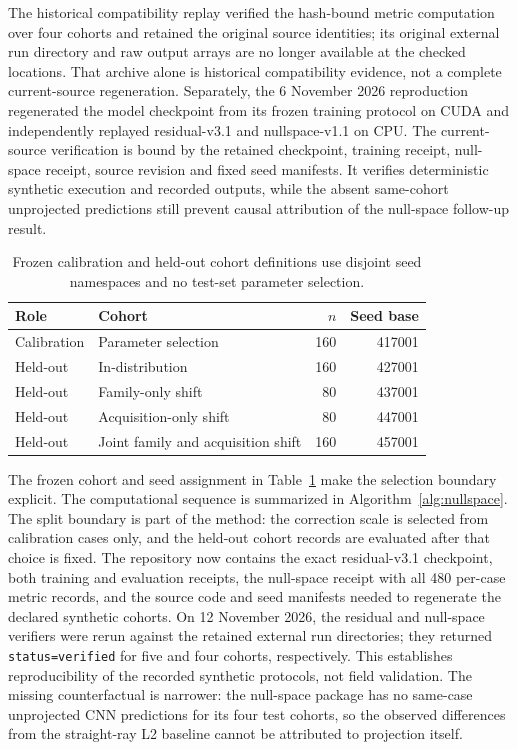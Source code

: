 \documentclass[11pt]{article}
\begin{document}


The historical compatibility replay verified the hash-bound metric computation over four cohorts and retained the original source identities; its original external run directory and raw output arrays are no longer available at the checked locations. That archive alone is historical compatibility evidence, not a complete current-source regeneration. Separately, the 6 November 2026 reproduction regenerated the model checkpoint from its frozen training protocol on CUDA and independently replayed residual-v3.1 and nullspace-v1.1 on CPU. The current-source verification is bound by the retained checkpoint, training receipt, null-space receipt, source revision and fixed seed manifests. It verifies deterministic synthetic execution and recorded outputs, while the absent same-cohort unprojected predictions still prevent causal attribution of the null-space follow-up result.

\begin{table}[htbp]
\centering
\caption{Frozen calibration and held-out cohort definitions use disjoint seed namespaces and no test-set parameter selection.}
\label{tab:cohort-design}
\begin{tabular}{llrr}
\toprule
Role & Cohort & $n$ & Seed base \\
\midrule
Calibration & Parameter selection & 160 & 417001 \\
Held-out & In-distribution & 160 & 427001 \\
Held-out & Family-only shift & 80 & 437001 \\
Held-out & Acquisition-only shift & 80 & 447001 \\
Held-out & Joint family and acquisition shift & 160 & 457001 \\
\bottomrule
\end{tabular}
\end{table}

The frozen cohort and seed assignment in Table~\ref{tab:cohort-design} make the selection boundary explicit. The computational sequence is summarized in Algorithm~\ref{alg:nullspace}. The split boundary is part of the method: the correction scale is selected from calibration cases only, and the held-out cohort records are evaluated after that choice is fixed. The repository now contains the exact residual-v3.1 checkpoint, both training and evaluation receipts, the null-space receipt with all 480 per-case metric records, and the source code and seed manifests needed to regenerate the declared synthetic cohorts. On 12 November 2026, the residual and null-space verifiers were rerun against the retained external run directories; they returned \texttt{status=verified} for five and four cohorts, respectively. This establishes reproducibility of the recorded synthetic protocols, not field validation. The missing counterfactual is narrower: the null-space package has no same-case unprojected CNN predictions for its four test cohorts, so the observed differences from the straight-ray L2 baseline cannot be attributed to projection itself.
\end{document}
